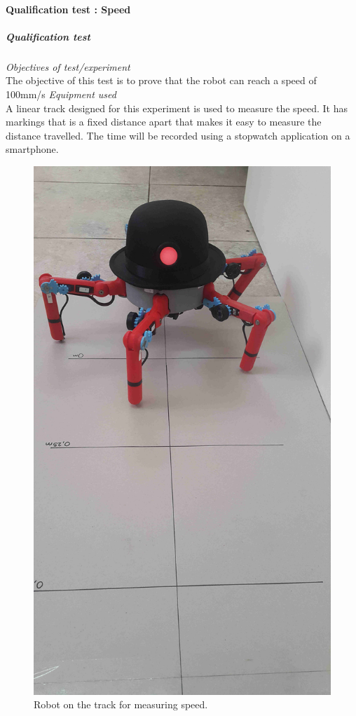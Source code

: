 \paragraph{Qualification test  : Speed}
\subparagraph{Qualification test}
\textit{Objectives of test/experiment}\\
The objective of this test is to prove that the robot can reach a speed of 100mm/s
\textit{Equipment used}\\
A linear track designed for this experiment is used to measure the speed. It has markings that is a fixed distance apart that makes it easy to measure the distance travelled. The time will be recorded using a stopwatch application on a smartphone. 
\begin{figure}[H]
\centering
\includegraphics[scale = 1]{pics/Res6.jpg}
\caption{Robot on the track for measuring speed.}
\label{fig:Res6}
\end{figure}
